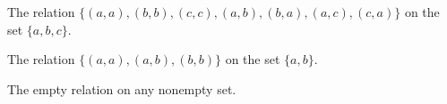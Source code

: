 \exercise
\subexercise
The relation $\{(a,a),(b,b),(c,c),(a,b),(b,a),(a,c),(c,a)\}$ on the set $\{a,b,c\}$.

\subexercise
The relation $\{(a,a),(a,b),(b,b)\}$ on the set $\{a,b\}$.

\subexercise
The empty relation on any nonempty set.
